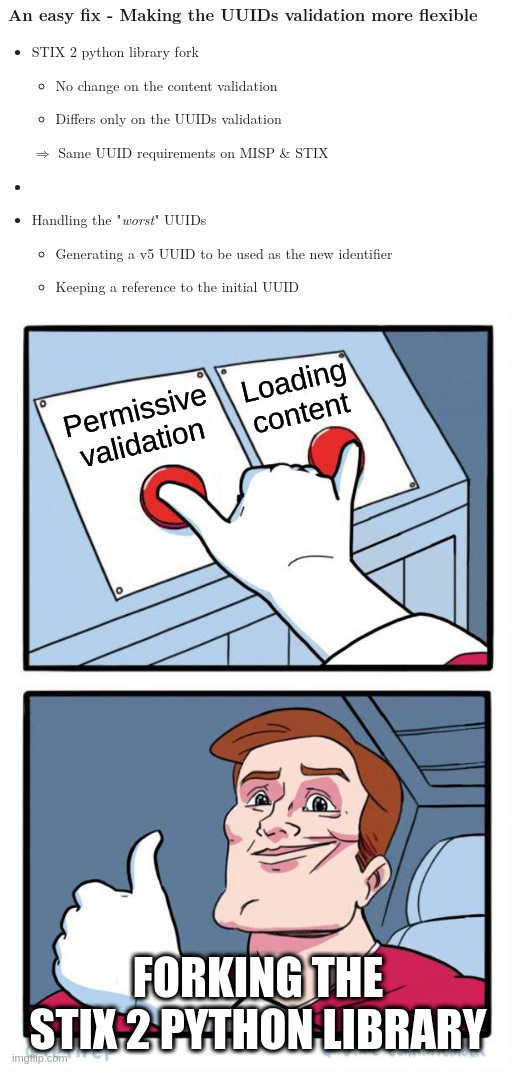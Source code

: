 \begin{frame}
    \frametitle{An easy fix - Making the UUIDs validation more flexible}
    \begin{minipage}{0.7\textwidth}
        \begin{itemize}
            \item STIX 2 python library fork\footnotemark[1]
            \begin{itemize}
                \item No change on the content validation
                \item Differs only on the UUIDs validation
            \end{itemize}
            $\Rightarrow$ Same UUID requirements on MISP \& STIX
            \item[]
            \item Handling the "\emph{worst}" UUIDs
            \begin{itemize}
                \item Generating a v5 UUID to be used as the new identifier
                \item Keeping a reference to the initial UUID
            \end{itemize}
        \end{itemize}
    \end{minipage}%
    \begin{minipage}{0.3\textwidth}
        \includegraphics[scale=0.25]{images/two_buttons_solution.jpg}

\end{minipage}
\end{frame}
